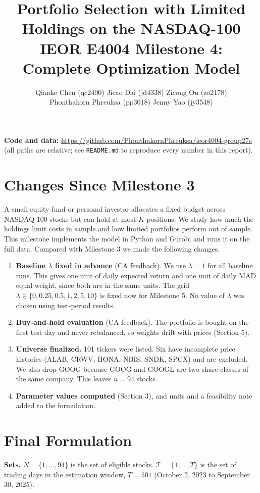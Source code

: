 \documentclass[11pt]{article}
\title{\vspace{-1.6cm}Portfolio Selection with Limited Holdings on the NASDAQ-100\\
\large IEOR E4004 Milestone 4: Complete Optimization Model}
\author{Qianke Chen (qc2400) \quad Jieao Dai (jd4338) \quad Zicong Ou (zo2178)\\
Phonthakorn Phreuksa (pp3018) \quad Jenny Yao (jy3548)}
\date{\vspace{-0.6cm}}
\begin{document}
\maketitle

\textbf{Code and data:} \url{https://github.com/PhonthakornPhreuksa/ieor4004-group27e} \; (all paths are relative; see \texttt{README.md} to reproduce every number in this report).

\section{Changes Since Milestone 3}
A small equity fund or personal investor allocates a fixed budget across NASDAQ-100 stocks but can hold at most $K$ positions. We study how much the holdings limit costs in sample and how limited portfolios perform out of sample. This milestone implements the model in Python and Gurobi and runs it on the full data. Compared with Milestone 3 we made the following changes.

\begin{enumerate}[leftmargin=*]
\item \textbf{Baseline $\lambda$ fixed in advance} (CA feedback). We use $\lambda = 1$ for all baseline runs. This gives one unit of daily expected return and one unit of daily MAD equal weight, since both are in the same units. The grid $\lambda \in \{0, 0.25, 0.5, 1, 2, 5, 10\}$ is fixed now for Milestone 5. No value of $\lambda$ was chosen using test-period results.
\item \textbf{Buy-and-hold evaluation} (CA feedback). The portfolio is bought on the first test day and never rebalanced, so weights drift with prices (Section 5).
\item \textbf{Universe finalized.} 101 tickers were listed. Six have incomplete price histories (ALAB, CRWV, HONA, NBIS, SNDK, SPCX) and are excluded. We also drop GOOG because GOOG and GOOGL are two share classes of the same company. This leaves $n = 94$ stocks.
\item \textbf{Parameter values computed} (Section 3), and units and a feasibility note added to the formulation.
\end{enumerate}

\section{Final Formulation}
\textbf{Sets.} $N=\{1,\dots,94\}$ is the set of eligible stocks. $\mathcal{T}=\{1,\dots,T\}$ is the set of trading days in the estimation window, $T=501$ (October 2, 2023 to September 30, 2025).
\end{document}
